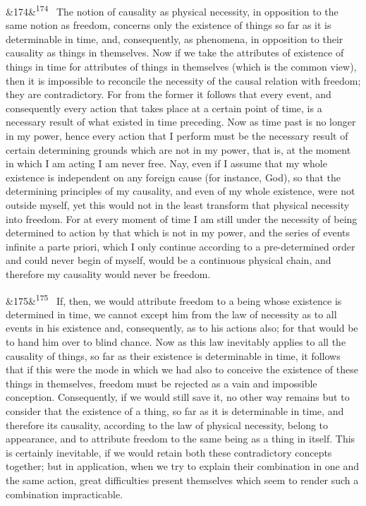 \documentclass[12pt]{article}
\newcommand{\para}[1][]{\par\noindent\ifx&#1&\else\textsuperscript{\footnotesize #1}~\fi}
\begin{document}
\para[174] The notion of causality as physical necessity, in opposition to the same notion as freedom, concerns only the existence of things so far as it is determinable in time, and, consequently, as phenomena, in opposition to their causality as things in themselves. Now if we take the attributes of existence of things in time for attributes of things in themselves (which is the common view), then it is impossible to reconcile the necessity of the causal relation with freedom; they are contradictory. For from the former it follows that every event, and consequently every action that takes place at a certain point of time, is a necessary result of what existed in time preceding. Now as time past is no longer in my power, hence every action that I perform must be the necessary result of certain determining grounds which are not in my power, that is, at the moment in which I am acting I am never free. Nay, even if I assume that my whole existence is independent on any foreign cause (for instance, God), so that the determining principles of my causality, and even of my whole existence, were not outside myself, yet this would not in the least transform that physical necessity into freedom. For at every moment of time I am still under the necessity of being determined to action by that which is not in my power, and the series of events infinite a parte priori, which I only continue according to a pre-determined order and could never begin of myself, would be a continuous physical chain, and therefore my causality would never be freedom.

\para[175] If, then, we would attribute freedom to a being whose existence is determined in time, we cannot except him from the law of necessity as to all events in his existence and, consequently, as to his actions also; for that would be to hand him over to blind chance. Now as this law inevitably applies to all the causality of things, so far as their existence is determinable in time, it follows that if this were the mode in which we had also to conceive the existence of these things in themselves, freedom must be rejected as a vain and impossible conception. Consequently, if we would still save it, no other way remains but to consider that the existence of a thing, so far as it is determinable in time, and therefore its causality, according to the law of physical necessity, belong to appearance, and to attribute freedom to the same being as a thing in itself. This is certainly inevitable, if we would retain both these contradictory concepts together; but in application, when we try to explain their combination in one and the same action, great difficulties present themselves which seem to render such a combination impracticable.
\end{document}
